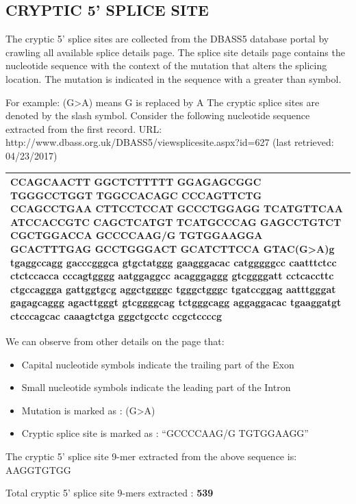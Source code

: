 \documentclass[12pt,a4paper]{article}
\begin{document}
	\subsection{CRYPTIC 5' SPLICE SITE}
	
	The cryptic 5’ splice sites are collected from the DBASS5 database portal \cite{dbass-0, dbass3} by crawling all available splice details page. The splice site details page contains the nucleotide sequence with the context of the mutation that alters the splicing location. The mutation is indicated in the sequence with a greater than symbol. \par
	For example: (G>A) means G is replaced by A \newline
	The cryptic splice sites are denoted by the slash symbol. \newline
	Consider the following nucleotide sequence extracted from the first record.\newline
	URL: http://www.dbass.org.uk/DBASS5/viewsplicesite.aspx?id=627 (last retrieved: 04/23/2017)

		
	\begin{tabular}{ | p{\linewidth} |}
		\hline
		CCAGCAACTT GGCTCTTTTT GGAGAGCGGC TGGGCCTGGT TGGCCACAGC CCCAGTTCTG CCAGCCTGAA CTTCCTCCAT GCCCTGGAGG TCATGTTCAA ATCCACCGTC CAGCTCATGT TCATGCCCAG GAGCCTGTCT CGCTGGACCA GCCCCAA\textbf{G/G} TGTGGAAGGA GCACTTTGAG GCCTGGGACT GCATCTTCCA GTAC\textbf{(G>A)}g tgaggccagg gacccgggca gtgctatggg gaagggacac catgggggcc caatttctcc ctctccacca cccagtgggg aatggaggcc acagggaggg gtcggggatt cctcaccttc ctgccaggga gattggtgcg aggctggggc tgggctgggc tgatccggag aatttgggat gagagcaggg agacttgggt gtcggggcag tctgggcagg aggaggacac tgaaggatgt ctcccagcac caaagtctga gggctgcctc ccgctccccg \\
		\hline
	\end{tabular}
	
	We can observe from other details on the page that:
	\begin{itemize}
		\item Capital nucleotide symbols indicate the trailing part of the Exon
		\item Small nucleotide symbols indicate the leading part of the Intron
		\item Mutation is marked as : (G>A)
		\item Cryptic splice site is marked as : “GCCCCAAG/G TGTGGAAGG”
	\end{itemize}
	The cryptic 5’ splice site 9-mer extracted from the above sequence is: AAGGTGTGG \par
	Total cryptic 5’ splice site 9-mers extracted : \textbf{539}
\end{document}
